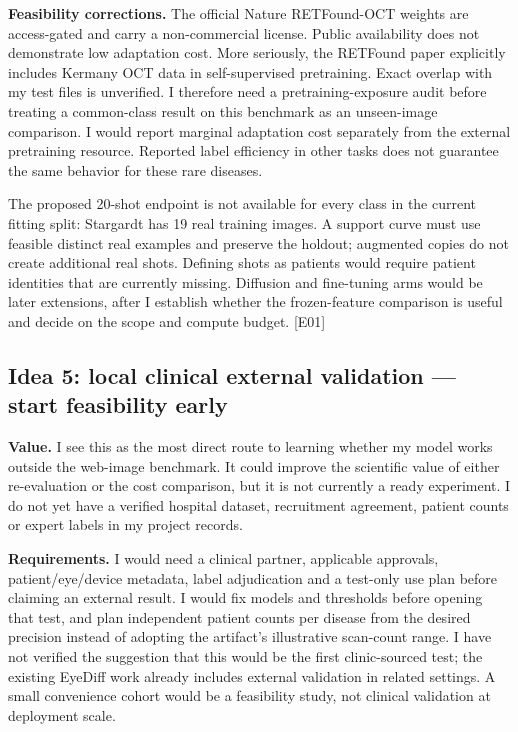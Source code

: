 \documentclass[11pt,a4paper]{article}
\newcommand{\ev}[1]{\textcolor{Link}{\textsf{[#1]}}}
\begin{document}
\textbf{Feasibility corrections.} The official Nature RETFound-OCT weights are
access-gated and carry a non-commercial license. Public availability does not
demonstrate low adaptation cost. More seriously, the RETFound paper explicitly
includes Kermany OCT data in self-supervised pretraining. Exact overlap with
my test files is unverified. I therefore need a pretraining-exposure audit
before treating a common-class result on this benchmark as an unseen-image
comparison. I would report marginal adaptation cost separately from the
external pretraining resource. Reported label efficiency in other tasks
does not guarantee the same behavior for these rare diseases.
\cite{retfound,retfoundweights}

The proposed 20-shot endpoint is not available for every class in the current
fitting split: Stargardt has 19 real training images. A support curve must use
feasible distinct real examples and preserve the holdout; augmented copies do
not create additional real shots. Defining shots as patients would require
patient identities that are currently missing. Diffusion and fine-tuning arms
would be later extensions, after I establish whether the frozen-feature
comparison is useful and decide on the scope and compute budget. \ev{E01}

\subsection{Idea 5: local clinical external validation --- start feasibility early}

\textbf{Value.} I see this as the most direct route to learning whether my
model works outside the web-image benchmark. It could improve the scientific value
of either re-evaluation or the cost comparison, but it is not currently a
ready experiment. I do not yet have a verified hospital dataset, recruitment
agreement, patient counts or expert labels in my project records.

\textbf{Requirements.} I would need a clinical partner, applicable approvals,
patient/eye/device metadata, label adjudication and a test-only use plan before
claiming an external result. I would fix models and thresholds before opening
that test, and plan independent patient counts per disease from the desired
precision instead of adopting the artifact's illustrative scan-count range.
I have not verified the suggestion that this would be the first clinic-sourced test;
the existing EyeDiff work already includes external validation in related
settings. A small convenience cohort would be a feasibility study, not
clinical validation at deployment scale. \cite{eyediff}
\end{document}
